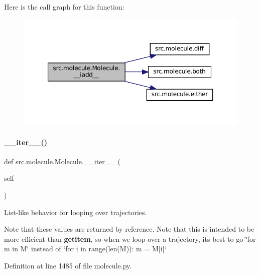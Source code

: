 Here is the call graph for this function\+:
\nopagebreak
\begin{figure}[H]
\begin{center}
\leavevmode
\includegraphics[width=350pt]{classsrc_1_1molecule_1_1Molecule_a4a1e6648a99afd550e7b24db3a2b249b_cgraph}
\end{center}
\end{figure}
\mbox{\label{classsrc_1_1molecule_1_1Molecule_a05079753fc6897507fa02eb4ef57fc77}} 
\paragraph{\texorpdfstring{\+\_\+\+\_\+iter\+\_\+\+\_\+()}{\_\_iter\_\_()}}
{\footnotesize\ttfamily def src.\+molecule.\+Molecule.\+\_\+\+\_\+iter\+\_\+\+\_\+ (\begin{DoxyParamCaption}\item[{}]{self }\end{DoxyParamCaption})}



List-\/like behavior for looping over trajectories. 

Note that these values are returned by reference. Note that this is intended to be more efficient than {\bfseries getitem}, so when we loop over a trajectory, it\textquotesingle{}s best to go \char`\"{}for m in M\char`\"{} instead of \char`\"{}for i in range(len(\+M))\+: m = M\mbox{[}i\mbox{]}\char`\"{} 

Definition at line 1485 of file molecule.\+py.

\mbox{\label{classsrc_1_1molecule_1_1Molecule_a23a3a5c340084abc00fb577d2b3c85c2}} 
